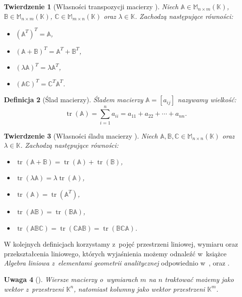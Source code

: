 \documentclass[12pt,a4paper]{report}
\newtheorem{df}{Definicja}[chapter]
\newtheorem{tw}[df]{Twierdzenie}
\newtheorem{uwaga}[df]{Uwaga}
\newcommand{\setK}{\mathbb{K}}
\newcommand{\tr}[1]{\operatorname{tr}\left({#1} \right)}
\begin{document}
\begin{tw}[Własności transpozycji macierzy {\citep[Sec 5.1 Tw. 5.1]{ealIII}}]
Niech $\mathbb{A} \in \mathbb{M}_{n \times m} (\setK)$, $\mathbb{B} \in \mathbb{M}_{n \times m} (\setK)$, $\mathbb{C} \in \mathbb{M}_{m \times n} (\setK)$ oraz $\lambda \in \setK$.
Zachodzą następujące równości:
\begin{itemize}
\item $(\mathbb{A}^T)^T = \mathbb{A}$,
\item $(\mathbb{A} + \mathbb{B})^T = \mathbb{A}^T + \mathbb{B}^T$,
\item $(\lambda \mathbb{A})^T = \lambda \mathbb{A}^T$,
\item $(\mathbb{A}\mathbb{C})^T = \mathbb{C}^T \mathbb{A}^T$.
\end{itemize}
\end{tw}

\begin{df}[Ślad macierzy]{\citep[Sec 6.4]{ealIII}}
Śladem macierzy  $\mathbb{A} = [a_{ij}]$ nazywamy wielkość:
$$
\tr{\mathbb{A}} = \sum_{i=1}^n a_{ii} = a_{11} + a_{22} + \cdots + a_{nn}.
$$
\end{df}


\begin{tw}[Własności śladu macierzy {\citep[Sec 6.4]{ealIII}}]
Niech $\mathbb{A}, \mathbb{B}, \mathbb{C} \in \mathbb{M}_{n \times n} (\setK)$ oraz $\lambda \in \setK$.
Zachodzą następujące równości:
\begin{itemize}
\item $\tr{\mathbb{A} + \mathbb{B}} = \tr{\mathbb{A}} + \tr{\mathbb{B}}$,
\item $\tr{\lambda \mathbb{A}} = \lambda \tr{\mathbb{A}}$,
\item $\tr{\mathbb{A}} =\tr{\mathbb{A}^T}$,
\item $\tr{\mathbb{A} \mathbb{B}}  = \tr{\mathbb{B} \mathbb{A}} $,
\item $\tr{\mathbb{A} \mathbb{B} \mathbb{C}}  = \tr{\mathbb{C} \mathbb{A} \mathbb{B}} = \tr{\mathbb{B} \mathbb{C} \mathbb{A}}$.
\end{itemize}
\end{tw}

W kolejnych definicjach korzystamy z~pojęć przestrzeni liniowej, wymiaru oraz przekształcenia liniowego, których wyjaśnienia możemy odnaleźć w~książce \textit{Algebra liniowa z~elementami geometrii analitycznej} odpowiednio w~{\citep[Sec 7.1]{alzega}}, {\citep[Sec 7.5]{alzega}} oraz {\citep[Sec 9.1]{alzega}}.

\begin{uwaga}[{\citep[Sec 8.1]{alzega}}]
Wiersze macierzy o~wymiarach $m$ na $n$ traktować możemy jako wektor z~przestrzeni $\setK^n$, natomiast kolumny jako wektor przestrzeni $\setK^m$.
\end{uwaga}
\end{document}
